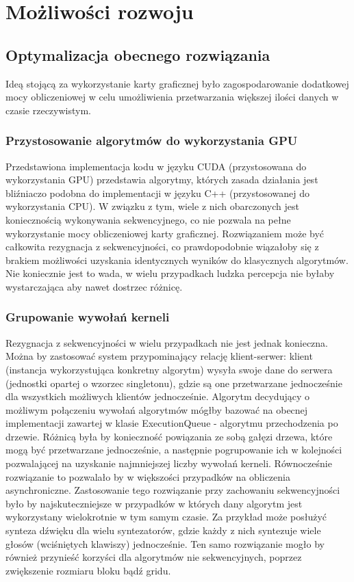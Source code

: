 \chapter{Możliwości rozwoju}

\section{Optymalizacja obecnego rozwiązania}
Ideą stojącą za wykorzystanie karty graficznej było zagospodarowanie dodatkowej mocy obliczeniowej w celu umożliwienia przetwarzania większej ilości danych w czasie rzeczywistym.

\subsection{Przystosowanie algorytmów do wykorzystania GPU}
Przedstawiona implementacja kodu w języku CUDA (przystosowana do wykorzystania GPU) przedstawia algorytmy, których zasada działania jest bliźniaczo podobna do implementacji w języku C++ (przystosowanej do wykorzystania CPU). W związku z tym, wiele z nich obarczonych jest koniecznością wykonywania sekwencyjnego, co nie pozwala na pełne wykorzystanie mocy obliczeniowej karty graficznej. Rozwiązaniem może być całkowita rezygnacja z sekwencyjności, co prawdopodobnie wiązałoby się z brakiem możliwości uzyskania identycznych wyników do klasycznych algorytmów. Nie koniecznie jest to wada, w wielu przypadkach ludzka percepcja nie byłaby wystarczająca aby nawet dostrzec różnicę.

\subsection{Grupowanie wywołań kerneli}
Rezygnacja z sekwencyjności w wielu przypadkach nie jest jednak konieczna. Można by zastosować system przypominający relację klient-serwer: klient (instancja wykorzystująca konkretny algorytm) wysyła swoje dane do serwera (jednostki opartej o wzorzec singletonu), gdzie są one przetwarzane jednocześnie dla wszystkich możliwych klientów jednocześnie. Algorytm decydujący o możliwym połączeniu wywołań algorytmów mógłby bazować na obecnej implementacji zawartej w klasie ExecutionQueue - algorytmu przechodzenia po drzewie. Różnicą była by konieczność powiązania ze sobą gałęzi drzewa, które mogą być przetwarzane jednocześnie, a następnie pogrupowanie ich w kolejności pozwalającej na uzyskanie najmniejszej liczby wywołań kerneli. Równocześnie rozwiązanie to pozwalało by w większości przypadków na obliczenia asynchroniczne.
Zastosowanie tego rozwiązanie przy zachowaniu sekwencyjności było by najskuteczniejsze w przypadków w których dany algorytm jest wykorzystany wielokrotnie w tym samym czasie. Za przykład może posłużyć synteza dźwięku dla wielu syntezatorów, gdzie każdy z nich syntezuje wiele głosów (wciśniętych klawiszy) jednocześnie. Ten samo rozwiązanie mogło by również przynieść korzyści dla algorytmów nie sekwencyjnych, poprzez zwiększenie rozmiaru bloku bądź gridu.

